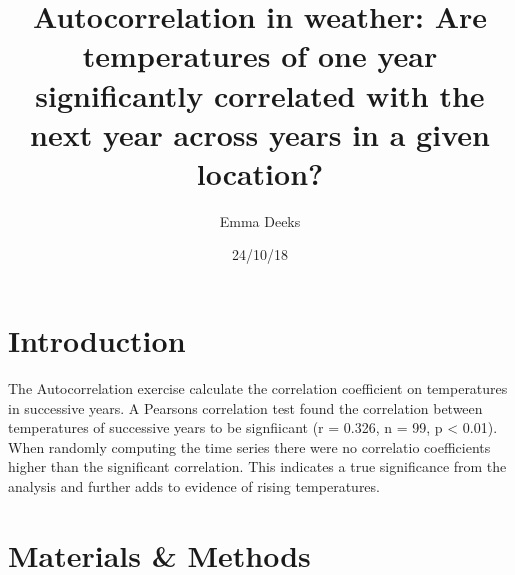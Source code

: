 \documentclass[12pt]{article}
\title{Autocorrelation in weather: Are temperatures of one year significantly correlated with the next year across years in a given location?}
\author{Emma Deeks}
\date{24/10/18}
\begin{document}
    \maketitle

    \begin{abstract}

    \end{abstract}

    \section{Introduction}
        The Autocorrelation exercise calculate the correlation coefficient on temperatures in successive years. A Pearsons correlation test found the correlation between temperatures of successive years to be signfiicant (r = 0.326, n = 99, p < 0.01).
        When randomly computing the time series there were no correlatio coefficients higher than the significant correlation. This indicates a true significance from the analysis and further adds to evidence of rising temperatures. 

  
    \section{Materials \& Methods}

  


    
    
\end{document}
